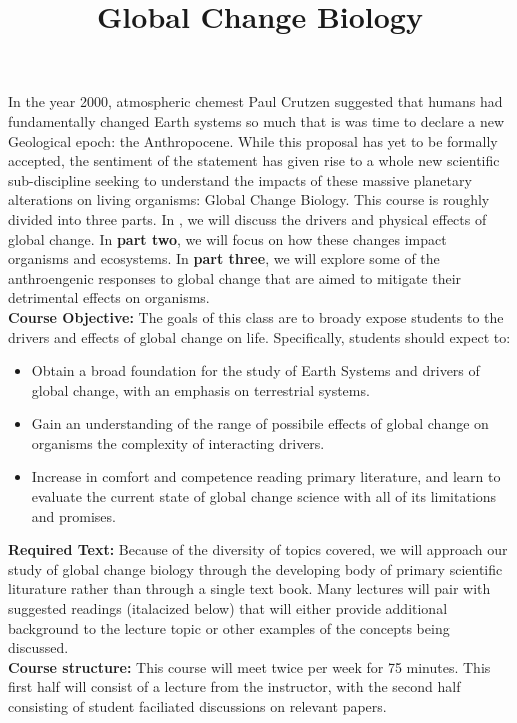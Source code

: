 \documentclass{article}\usepackage[]{graphicx}\usepackage[]{color}
\begin{document}
\title{Global Change Biology}
\date{}
\maketitle{}
\indent In the year 2000, atmospheric chemest Paul Crutzen suggested that humans had fundamentally changed Earth systems so much that is was time to declare a new Geological epoch: the Anthropocene. While this proposal has yet to be formally accepted, the sentiment of the statement has given rise to a whole new scientific sub-discipline seeking to understand the impacts of these massive planetary alterations on living organisms: Global Change Biology. This course is roughly divided into three parts. In , we will discuss the drivers and physical effects of global change. In \textbf{part two}, we will focus on how these changes impact organisms and ecosystems. In \textbf{part three}, we will explore some of the anthroengenic responses to global change that are aimed to mitigate their detrimental effects on organisms. \\

\indent\textbf{Course Objective:} The goals of this class are to broady expose students to the drivers and effects of global change on life. Specifically, students should expect to:
\begin{itemize}
\item Obtain a broad foundation for the study of Earth Systems and drivers of global change, with an emphasis on terrestrial systems.
\item Gain an understanding of the range of possibile effects of global change on organisms the complexity of interacting drivers.
\item Increase in comfort and competence reading primary literature, and learn to evaluate the current state of global change science with all of its limitations and promises.
\end{itemize}

\textbf{Required Text:} Because of the diversity of topics covered, we will approach our study of global change biology through the developing body of primary scientific liturature rather than through a single text book. Many lectures will pair with suggested readings (italacized below) that will either provide additional background to the lecture topic or other examples of the concepts being discussed.\\

\textbf{Course structure:} This course will meet twice per week for 75 minutes. This first half will consist of a lecture from the instructor, with the second half consisting of student faciliated discussions on relevant papers.\\
\end{document}
